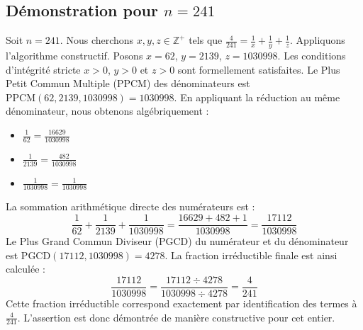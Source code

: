 \documentclass[11pt,a4paper]{article}
\begin{document}
\subsection{Démonstration pour $n = 241$}
Soit $n = 241$. Nous cherchons $x, y, z \in \mathbb{Z}^{+}$ tels que $\frac{4}{241} = \frac{1}{x} + \frac{1}{y} + \frac{1}{z}$.
Appliquons l'algorithme constructif. Posons $x = 62$, $y = 2139$, $z = 1030998$.
Les conditions d'intégrité stricte $x > 0$, $y > 0$ et $z > 0$ sont formellement satisfaites.
Le Plus Petit Commun Multiple (PPCM) des dénominateurs est $\text{PPCM}(62, 2139, 1030998) = 1030998$.
En appliquant la réduction au même dénominateur, nous obtenons algébriquement :
\begin{itemize}
    \item $\frac{1}{62} = \frac{16629}{1030998}$
    \item $\frac{1}{2139} = \frac{482}{1030998}$
    \item $\frac{1}{1030998} = \frac{1}{1030998}$
\end{itemize}
La sommation arithmétique directe des numérateurs est :
$$ \frac{1}{62} + \frac{1}{2139} + \frac{1}{1030998} = \frac{16629 + 482 + 1}{1030998} = \frac{17112}{1030998} $$
Le Plus Grand Commun Diviseur (PGCD) du numérateur et du dénominateur est $\text{PGCD}(17112, 1030998) = 4278$.
La fraction irréductible finale est ainsi calculée :
$$ \frac{17112}{1030998} = \frac{17112 \div 4278}{1030998 \div 4278} = \frac{4}{241} $$
Cette fraction irréductible correspond exactement par identification des termes à $\frac{4}{241}$. L'assertion est donc démontrée de manière constructive pour cet entier.
\end{document}
